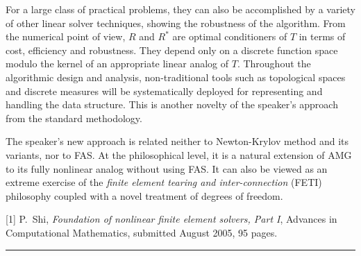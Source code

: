\documentclass[twosided]{report}
\begin{document}
For a
large class of practical problems, they can also be
accomplished by a variety of other linear solver techniques,
showing the robustness of the algorithm. From the numerical
point of view, $R$ and $R^*$ are optimal conditioners of $T$
in terms of cost, efficiency and robustness. They depend
only on a discrete function space modulo the kernel of an
appropriate linear analog of $T$. Throughout the algorithmic
design and analysis, non-traditional tools such as
topological spaces and discrete measures will be
systematically deployed for representing and handling the
data structure. This is another novelty of the speaker's
approach from the standard methodology.

The speaker's
new approach is related neither to Newton-Krylov method and
its variants, nor to FAS. At the philosophical level, it is
a natural extension of AMG to its fully nonlinear analog
without using FAS. It can also be viewed as an extreme
exercise of the {\it finite element tearing and
inter-connection} (FETI) philosophy coupled with a novel
treatment of degrees of freedom.

[1]
P.~Shi, {\em Foundation of nonlinear finite element
solvers, Part I}, Advances in Computational Mathematics,
submitted August 2005, 95 pages.


	\begin{center} \rule{6in}{1pt} \end{center}
\end{document}
